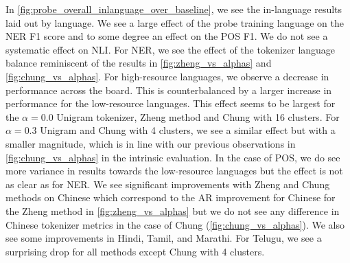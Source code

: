 In \autoref{fig:probe_overall_inlanguage_over_baseline}, we see the in-language results laid out by language. We see a large effect of the probe training language on the NER F1 score and to some degree an effect on the POS F1. We do not see a systematic effect on NLI. For NER, we see the effect of the tokenizer language balance reminiscent of the results in \autoref{fig:zheng_vs_alphas} and \autoref{fig:chung_vs_alphas}. For high-resource languages, we observe a decrease in performance across the board. This is counterbalanced by a larger increase in performance for the low-resource languages. This effect seems to be largest for the $\alpha=0.0$ Unigram tokenizer, Zheng method and Chung with 16 clusters. For $\alpha=0.3$ Unigram and Chung with 4 clusters, we see a similar effect but with a smaller magnitude, which is in line with our previous observations in \autoref{fig:chung_vs_alphas} in the intrinsic evaluation. In the case of POS, we do see more variance in results towards the low-resource languages but the effect is not as clear as for NER. We see significant improvements with Zheng and Chung methods on Chinese which correspond to the AR improvement for Chinese for the Zheng method in \autoref{fig:zheng_vs_alphas} but we do not see any difference in Chinese tokenizer metrics in the case of Chung (\autoref{fig:chung_vs_alphas}). We also see some improvements in Hindi, Tamil, and Marathi. For Telugu, we see a surprising drop for all methods except Chung with 4 clusters. %


